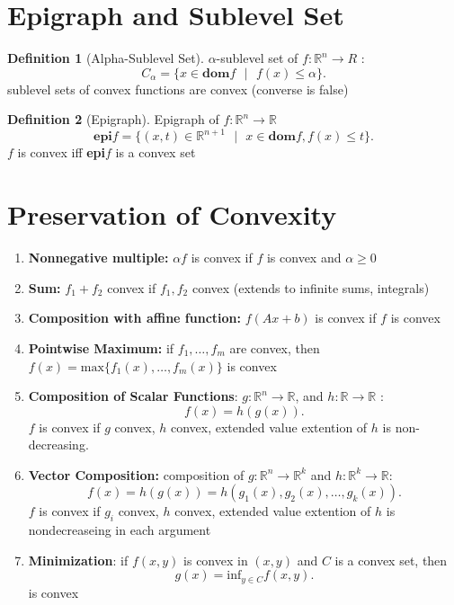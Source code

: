 \documentclass{report}
\theoremstyle{remark} \newtheorem{remark}{Remark}[section]
\theoremstyle{definition}
\newtheorem{definition}{Definition}[section]
\theoremstyle{definition}
\theoremstyle{definition}
\theoremstyle{remark}
\begin{document}
\section{Epigraph and Sublevel Set}
\begin{definition}[Alpha-Sublevel Set]
    $\alpha$-sublevel set of $f: \mathbb{R}^{n}\to R$ :
    \[
    C_\alpha = \{x \in\textbf{dom}f \text{ }| \text{ }f(x)\le \alpha \}
    .\] 
      sublevel sets of convex functions are convex (converse is false) 
\end{definition}

\begin{definition}[Epigraph]
    Epigraph of $f:\mathbb{R}^{n}\to \mathbb{R}$ 
    \[
    \textbf{epi}f = \{(x,t)\in \mathbb{R}^{n+1} \text{ }| \text{ }x\in \textbf{dom}f, f(x)\le t \}
    .\] 
      $f$ is convex iff \textbf{epi}$f$ is a convex set 
\end{definition}


\section{Preservation of Convexity}
\begin{enumerate}
    \item \textbf{Nonnegative multiple:} $\alpha f$ is convex if $f$ is convex and $\alpha\ge 0$
        \item \textbf{Sum:} $f_1+f_2$ convex if $f_1,f_2$ convex (extends to infinite sums, integrals)
            \item \textbf{Composition with affine function:} $f(Ax+b)$ is convex if $f$ is convex
                \item \textbf{Pointwise Maximum:} if $f_1,\ldots,f_m$ are convex, then $f(x) = \text{max}\{f_1(x),\ldots,f_m(x)\}$ is convex
                    \item \textbf{Composition of Scalar Functions}: $g:\mathbb{R}^{n}\to \mathbb{R}$, and $h:\mathbb{R}\to \mathbb{R}$ :
                        \[
                       f(x) = h(g(x)) 
                        .\] 
                        $f$ is convex if $g$ convex, $h$ convex, extended value extention of $h$ is non-decreasing.
                        \item \textbf{Vector Composition:} composition of $g: \mathbb{R}^{n}\to \mathbb{R}^{k}$ and $h:\mathbb{R}^{k}\to \mathbb{R}$:
                            \[
                            f(x) = h(g(x)) = h(g_1(x), g_2(x),\ldots,g_k(x))
                            .\] 
                            $f$ is convex if $g_i$ convex, $h$ convex, extended value extention of $h$ is nondecreaseing in each argument
                            \item \textbf{Minimization}: if $f(x,y)$ is convex in $(x,y)$ and $C$ is a convex set, then
                                \[
                                g(x) = \text{inf}_{y\in C}f(x,y)
                                .\] 
                                is convex
\end{enumerate}
\end{document}
